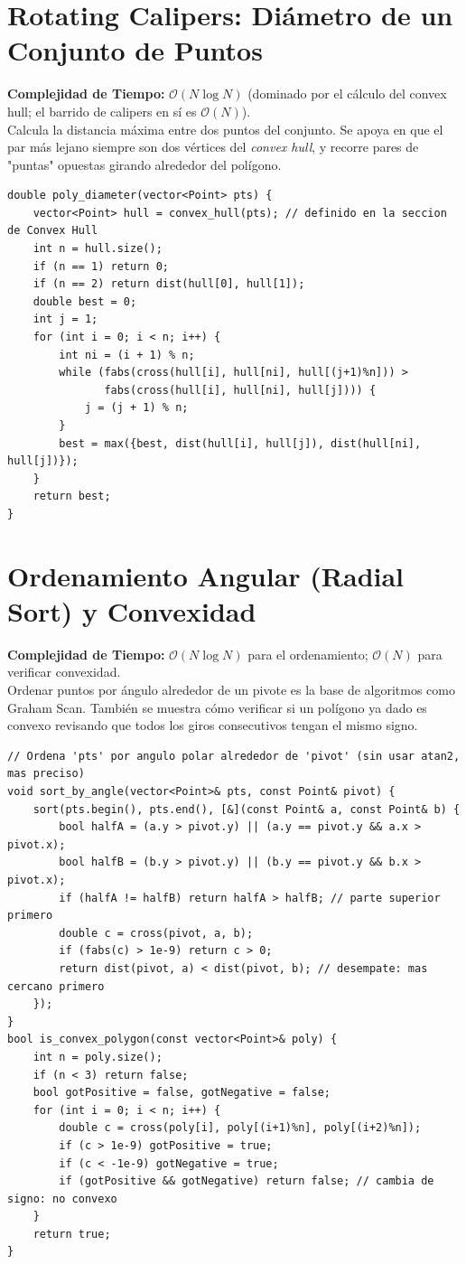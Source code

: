 \documentclass[10pt,twocolumn,letterpaper]{report}
\begin{document}
\section{Rotating Calipers: Diámetro de un Conjunto de Puntos}
\textbf{Complejidad de Tiempo:} $\mathcal{O}(N \log N)$ (dominado por el cálculo del convex hull; el barrido de calipers en sí es $\mathcal{O}(N)$). \\
Calcula la distancia máxima entre dos puntos del conjunto. Se apoya en que el par más lejano siempre son dos vértices del \textit{convex hull}, y recorre pares de "puntas" opuestas girando alrededor del polígono.
\begin{lstlisting}
double poly_diameter(vector<Point> pts) {
    vector<Point> hull = convex_hull(pts); // definido en la seccion de Convex Hull
    int n = hull.size();
    if (n == 1) return 0;
    if (n == 2) return dist(hull[0], hull[1]);
    double best = 0;
    int j = 1;
    for (int i = 0; i < n; i++) {
        int ni = (i + 1) % n;
        while (fabs(cross(hull[i], hull[ni], hull[(j+1)%n])) >
               fabs(cross(hull[i], hull[ni], hull[j]))) {
            j = (j + 1) % n;
        }
        best = max({best, dist(hull[i], hull[j]), dist(hull[ni], hull[j])});
    }
    return best;
}
\end{lstlisting}
\section{Ordenamiento Angular (Radial Sort) y Convexidad}
\textbf{Complejidad de Tiempo:} $\mathcal{O}(N \log N)$ para el ordenamiento; $\mathcal{O}(N)$ para verificar convexidad. \\
Ordenar puntos por ángulo alrededor de un pivote es la base de algoritmos como Graham Scan. También se muestra cómo verificar si un polígono ya dado es convexo revisando que todos los giros consecutivos tengan el mismo signo.
\begin{lstlisting}
// Ordena 'pts' por angulo polar alrededor de 'pivot' (sin usar atan2, mas preciso)
void sort_by_angle(vector<Point>& pts, const Point& pivot) {
    sort(pts.begin(), pts.end(), [&](const Point& a, const Point& b) {
        bool halfA = (a.y > pivot.y) || (a.y == pivot.y && a.x > pivot.x);
        bool halfB = (b.y > pivot.y) || (b.y == pivot.y && b.x > pivot.x);
        if (halfA != halfB) return halfA > halfB; // parte superior primero
        double c = cross(pivot, a, b);
        if (fabs(c) > 1e-9) return c > 0;
        return dist(pivot, a) < dist(pivot, b); // desempate: mas cercano primero
    });
}
bool is_convex_polygon(const vector<Point>& poly) {
    int n = poly.size();
    if (n < 3) return false;
    bool gotPositive = false, gotNegative = false;
    for (int i = 0; i < n; i++) {
        double c = cross(poly[i], poly[(i+1)%n], poly[(i+2)%n]);
        if (c > 1e-9) gotPositive = true;
        if (c < -1e-9) gotNegative = true;
        if (gotPositive && gotNegative) return false; // cambia de signo: no convexo
    }
    return true;
}
\end{lstlisting}
\end{document}
